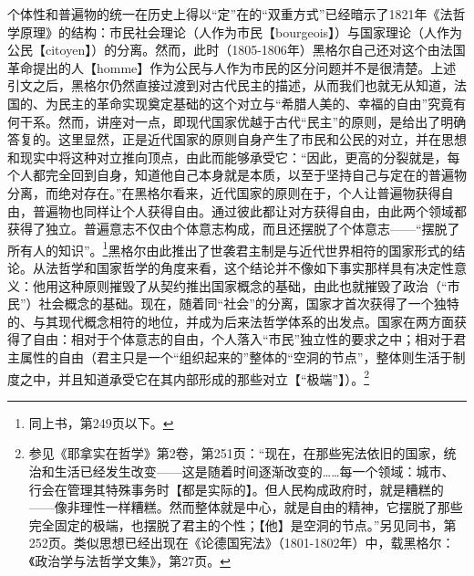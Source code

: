 个体性和普遍物的统一在历史上得以“定”在的“双重方式”已经暗示了1821年《法哲学原理》的结构：市民社会理论（人作为市民【bourgeois】）与国家理论（人作为公民【citoyen】）的分离。然而，此时（1805-1806年）黑格尔自己还对这个由法国革命提出的人【homme】作为公民与人作为市民的区分问题并不是很清楚。上述引文之后，黑格尔仍然直接过渡到对古代民主的描述，从而我们也就无从知道，法国的、为民主的革命实现奠定基础的这个对立与“希腊人美的、幸福的自由”究竟有何干系。然而，讲座对一点，即现代国家优越于古代“民主”的原则，是给出了明确答复的。这里显然，正是近代国家的原则自身产生了市民和公民的对立，并在思想和现实中将这种对立推向顶点，由此而能够承受它：“因此，更高的分裂就是，每个人都完全回到自身，知道他自己本身就是本质，以至于坚持自己与定在的普遍物分离，而绝对存在。”在黑格尔看来，近代国家的原则在于，个人让普遍物获得自由，普遍物也同样让个人获得自由。通过彼此都让对方获得自由，由此两个领域都获得了独立。普遍意志不仅由个体意志构成，而且还摆脱了个体意志——“摆脱了所有人的知识”。\footnote{同上书，第249页以下。}黑格尔由此推出了世袭君主制是与近代世界相符的国家形式的结论。从法哲学和国家哲学的角度来看，这个结论并不像如下事实那样具有决定性意义：他用这种原则摧毁了从契约推出国家概念的基础，由此也就摧毁了政治（“市民”）社会概念的基础。现在，随着同“社会”的分离，国家才首次获得了一个独特的、与其现代概念相符的地位，并成为后来法哲学体系的出发点。国家在两方面获得了自由：相对于个体意志的自由，个人落入“市民”独立性的要求之中；相对于君主属性的自由（君主只是一个“组织起来的”整体的“空洞的节点”，整体则生活于制度之中，并且知道承受它在其内部形成的那些对立【“极端”】）。\footnote{参见《耶拿实在哲学》第2卷，第251页：“现在，在那些宪法依旧的国家，统治和生活已经发生改变——这是随着时间逐渐改变的……每一个领域：城市、行会在管理其特殊事务时【都是实际的】。但人民构成政府时，就是糟糕的——像非理性一样糟糕。然而整体就是中心，就是自由的精神，它摆脱了那些完全固定的极端，也摆脱了君主的个性；【他】是空洞的节点。”另见同书，第252页。类似思想已经出现在《论德国宪法》（1801-1802年）中，载黑格尔：《政治学与法哲学文集》，第27页。}